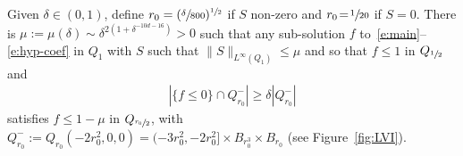 \begin{lemma}
\label{l:increase}
Given $\delta \in (0,1)$, define
$r_0 = (\sfrac{\delta}{800})^{\sfrac12}$ if $S$ non-zero and
$r_0\!=\!\sfrac{1}{20}$ if $S\!=\!0$. There is
\hbox{$\mu\!:=\!\mu(\delta)\sim \delta^{2 (1+\delta^{-10d-16})}\!>\!0$} such
that any sub-solution $f$ to~\eqref{e:main}--\eqref{e:hyp-coef}
in $Q_1$ with $S$ such that
$\| S\|_{L^{\infty}(Q_1)}\le \mu$ and so that $f\leq 1$ in
$Q_{\sfrac{1}{2}}$ and
\begin{align}
\label{eq:measure-hyp-pointwise}
\left| \{ f \leq 0 \} \cap Q_{r_0}^- \right| \ge \delta
\left| Q_{r_0}^- \right|
\end{align}
satisfies $f \le 1-\mu$ in $Q_{\sfrac{r_0}{2}}$, with
$Q_{r_0}^{-} := Q_{r_0}(-2r_0^2,0,0) =(-3r_0^2,-2r_0^2] \times
B_{r_0^3} \times B_{r_0}$ (see Figure~\ref{fig:LVI}).
\end{lemma}

